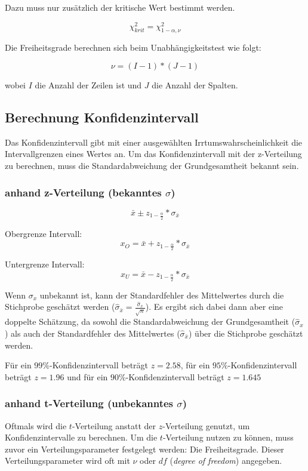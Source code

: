 \documentclass[11pt,a4paper]{article}
\begin{document}
Dazu muss nur zusätzlich der kritische Wert bestimmt werden.

$$\chi^2_{krit} = \chi^2_{1-\alpha, \nu}$$

Die Freiheitsgrade berechnen sich beim Unabhängigkeitstest wie folgt:

$$\nu = (I-1) * (J-1)$$ 

wobei $I$ die Anzahl der Zeilen ist und $J$ die Anzahl der Spalten. 

\subsection{Berechnung Konfidenzintervall}
Das Konfidenzintervall gibt mit einer ausgewählten Irrtumswahrscheinlichkeit die Intervallgrenzen eines Wertes an. Um das Konfidenzintervall mit der z-Verteilung zu berechnen, muss die Standardabweichung der Grundgesamtheit bekannt sein.

\subsubsection{anhand z-Verteilung (bekanntes \texorpdfstring{$\sigma$}{Sigma})}
$$\bar{x} \pm z_{1-\frac{\alpha}{2}} \ast {\sigma_{\bar{x}}}$$

Obergrenze Intervall:\\
$$x_O = \bar{x} + z_{1-\frac{\alpha}{2}} \ast {\sigma_{\bar{x}}}$$

Untergrenze Intervall:\\
$$x_U = \bar{x} - z_{1-\frac{\alpha}{2}} \ast {\sigma_{\bar{x}}}$$

Wenn $\sigma_{x}$ unbekannt ist, kann der Standardfehler des Mittelwertes durch die Stichprobe geschätzt werden ($\hat{\sigma}_{\bar{x}} = \frac{\hat{\sigma}_x}{\sqrt{n}}$). Es ergibt sich dabei dann aber eine doppelte Schätzung, da sowohl die Standardabweichung der Grundgesamtheit ($\hat{\sigma}_x$) als auch der Standardfehler des Mittelwertes ($\hat{\sigma}_{\bar{x}}$) über die Stichprobe geschätzt werden. 

Für ein $99\%$-Konfidenzintervall beträgt $z = 2.58$, für ein $95\%$-Konfidenzintervall beträgt $z= 1.96$ und für ein $90\%$-Konfidenzintervall beträgt $z = 1.645$

\subsubsection{anhand t-Verteilung (unbekanntes \texorpdfstring{$\sigma$}{Sigma})}
Oftmals wird die $t$-Verteilung anstatt der $z$-Verteilung genutzt, um Konfidenzintervalle zu berechnen. Um die $t$-Verteilung nutzen zu können, muss zuvor ein Verteilungsparameter festgelegt werden: Die Freiheitsgrade. Dieser Verteilungsparameter wird oft mit $\nu$ oder $df$ (\textit{degree of freedom}) angegeben. 
\end{document}
